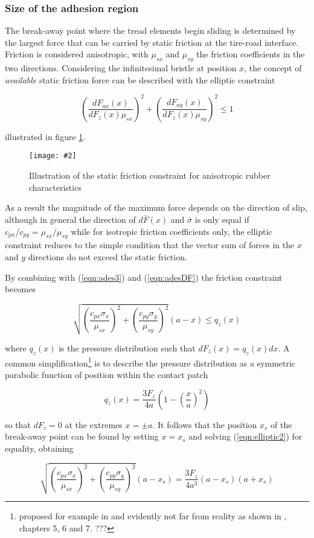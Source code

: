 \documentclass[12pt,a4paper]{report}
\newcommand{\figura}[5][htbp]{
\begin{figure}[#1]
\begin{center}
\texttt{[image: \#2]}
\caption{#4}\label{#5}
\end{center}
\end{figure}
}
\newcommand{\eq}[2]{
\begin{equation} \label{#1}
#2
\end{equation}
}
\newcommand{\req}[1]{
(\ref{#1})
}
\begin{document}
\subsubsection*{Size of the adhesion region}
The break-away point where the tread elements begin sliding is determined by the largest force that can be carried by static friction at the tire-road interface.
Friction is considered anisotropic, with $\mu_{sx}$ and $\mu_{sy}$ the friction coefficients in the two directions. %
Considering the infinitesimal bristle at position $x$, the concept of \emph{available} static friction force can be described with the elliptic constraint

\eq{eqn:elliptic}{\left(\frac{dF_{ax}(x)}{dF_z(x) \mu_{sx}}\right)^2 + \left(\frac{dF_{ay}(x)}{dF_z(x) \mu_{sy}}\right)^2 \leq 1}

illustrated in figure \ref{fig:elliptic}.
\figura{pix/fric_ellipse.jpg}{width=8cm}{Illustration of the static friction constraint for anisotropic rubber characteristics}{fig:elliptic}

As a result the magnitude of the maximum force depends on the direction of slip, although in general the direction of $d\bar{F}(x)$ and $\bar{\sigma}$ is only equal if $c_{px}/c_{py}=\mu_{sx}/\mu_{sy}$ while for isotropic friction coefficients only, the elliptic constraint reduces to the simple condition that the vector sum of forces in the $x$ and $y$ directions do not exceed the static friction.

By combining with \req{eqn:ades3} and \req{eqn:adesDF} the friction constraint becomes

\eq{eqn:elliptic2}{\sqrt{\left(\frac{c_{px} \sigma_x}{\mu_{sx}}\right)^2 + \left(\frac{c_{py} \sigma_y}{\mu_{sy}}\right)^2}(a-x) \leq q_z(x)}

where $q_z(x)$ is the pressure distribution such that $dF_z(x)=q_z(x)dx$. A common simplification\footnote{proposed for example in \citep{compare74} and evidently not far from reality as shown in \citep{nhtsa}, chapters 5, 6 and 7. ???} is to describe the pressure distribution as a symmetric parabolic function of position within the contact patch
\eq{eqn:presdist}{q_z(x)=\frac{3F_z}{4a}(1-(\frac{x}{a})^2)}
so that $dF_z = 0$ at the extremes $x=\pm a$.
It follows that the position $x_s$ of the break-away point can be found by setting $x=x_s$ and solving \req{eqn:elliptic2} for equality, obtaining

\eq{eqn:elliptic3}{\sqrt{\left(\frac{c_{px} \sigma_x}{\mu_{sx}}\right)^2 + \left(\frac{c_{py} \sigma_y}{\mu_{sy}}\right)^2}(a-x_s) = \frac{3F_z}{4a^3}(a-x_s)(a+x_s)}
\end{document}
